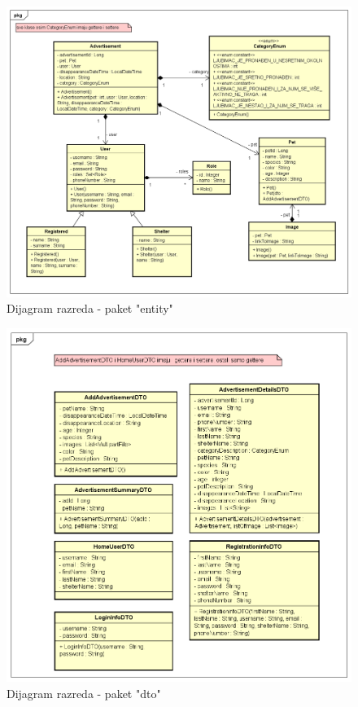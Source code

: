 			\begin{figure}[htb]
				\centering
				\includegraphics[width=\textwidth]{slike/dr3_entiteti.png}
				\caption{Dijagram razreda - paket "entity"}
			\end{figure}
			\pagebreak
			
			\begin{figure}[htb]
				\centering
				\includegraphics[width=\textwidth]{slike/dr4_dto.png}
				\caption{Dijagram razreda - paket "dto"}
			\end{figure}
			\pagebreak
			
